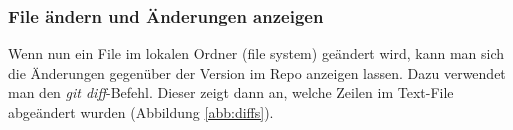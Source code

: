 \documentclass[twoside, 11pr]{article}
\begin{document}
\begin{figure}[!tbph]
\end{figure}


\subsubsection{File ändern und Änderungen anzeigen}

Wenn nun ein File im lokalen Ordner (file system) geändert wird, kann man sich die Änderungen gegenüber der Version im Repo anzeigen lassen. Dazu verwendet man den \textit{git diff}-Befehl. Dieser zeigt dann an, welche Zeilen im Text-File abgeändert wurden (Abbildung \ref{abb:diffs}).

\begin{figure}[!tbph]
\end{figure}
\end{document}
